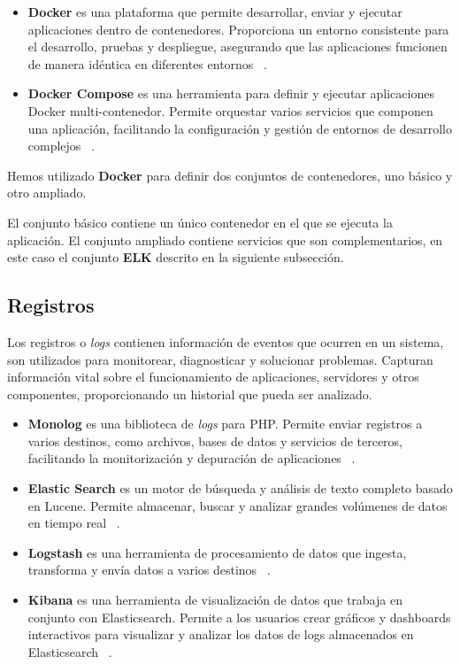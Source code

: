 \begin{itemize}
    \item \textbf{Docker} es una plataforma que permite desarrollar, enviar y ejecutar aplicaciones dentro de
    contenedores.
    Proporciona un entorno consistente para el desarrollo, pruebas y despliegue, asegurando que las aplicaciones
    funcionen de manera idéntica en diferentes entornos ~\cite{url_docker}.
    \item \textbf{Docker Compose} es una herramienta para definir y ejecutar aplicaciones Docker multi-contenedor.
    Permite orquestar varios servicios que componen una aplicación, facilitando la configuración y gestión de entornos
    de desarrollo complejos ~\cite{url_docker_compose}.
\end{itemize}

Hemos utilizado \textbf{Docker} para definir dos conjuntos de contenedores, uno básico y otro ampliado.

El conjunto básico contiene un único contenedor en el que se ejecuta la aplicación.
El conjunto ampliado contiene servicios que son complementarios, en este caso el conjunto \textbf{ELK} descrito en la
siguiente subsección.

\subsection{Registros}\label{subsec:chapter_4.logs}

Los registros o \textit{logs} contienen información de eventos que ocurren en un sistema, son utilizados para
monitorear, diagnosticar y solucionar problemas.
Capturan información vital sobre el funcionamiento de aplicaciones, servidores y otros componentes, proporcionando un
historial que pueda ser analizado.

\begin{itemize}
    \item \textbf{Monolog} es una biblioteca de \textit{logs} para PHP. Permite enviar registros a varios destinos, como
    archivos, bases de datos y servicios de terceros, facilitando la monitorización y depuración de aplicaciones
    ~\cite{url_monolog}.
    \item \textbf{Elastic Search} es un motor de búsqueda y análisis de texto completo basado en Lucene.
    Permite almacenar, buscar y analizar grandes volúmenes de datos en tiempo real
    ~\cite{url_elasticsearch}.
    \item \textbf{Logstash} es una herramienta de procesamiento de datos que ingesta, transforma y envía datos a varios
    destinos ~\cite{url_logstash}.
    \item \textbf{Kibana} es una herramienta de visualización de datos que trabaja en conjunto con Elasticsearch.
    Permite a los usuarios crear gráficos y dashboards interactivos para visualizar y analizar los datos de logs
    almacenados en Elasticsearch ~\cite{url_kibana}.
\end{itemize}

